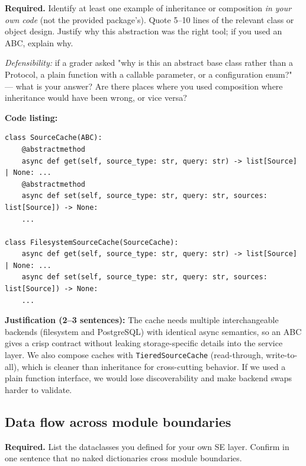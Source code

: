 \documentclass[11pt,a4paper]{article}
\begin{document}
\begin{deliverbox}
\textbf{Required.} Identify at least one example of inheritance or composition \emph{in your own code} (not the provided package's). Quote 5--10 lines of the relevant class or object design. Justify why this abstraction was the right tool; if you used an ABC, explain why.
\end{deliverbox}

\begin{probebox}
\textit{Defensibility:} if a grader asked "why is this an abstract base class rather than a Protocol, a plain function with a callable parameter, or a configuration enum?" --- what is your answer? Are there places where you used composition where inheritance would have been wrong, or vice versa?
\end{probebox}

\textbf{Code listing:}
\begin{lstlisting}[style=python]
class SourceCache(ABC):
    @abstractmethod
    async def get(self, source_type: str, query: str) -> list[Source] | None: ...
    @abstractmethod
    async def set(self, source_type: str, query: str, sources: list[Source]) -> None:
    ...

class FilesystemSourceCache(SourceCache):
    async def get(self, source_type: str, query: str) -> list[Source] | None: ...
    async def set(self, source_type: str, query: str, sources: list[Source]) -> None: 
    ...
\end{lstlisting}

\textbf{Justification (2--3 sentences):} The cache needs multiple interchangeable backends (filesystem and PostgreSQL) with identical async semantics, so an ABC gives a crisp contract without leaking storage-specific details into the service layer. We also compose caches with \texttt{TieredSourceCache} (read-through, write-to-all), which is cleaner than inheritance for cross-cutting behavior. If we used a plain function interface, we would lose discoverability and make backend swaps harder to validate.

\subsection{Data flow across module boundaries}

\begin{deliverbox}
\textbf{Required.} List the dataclasses you defined for your own SE layer. Confirm in one sentence that no naked dictionaries cross module boundaries.
\end{deliverbox}
\end{document}
